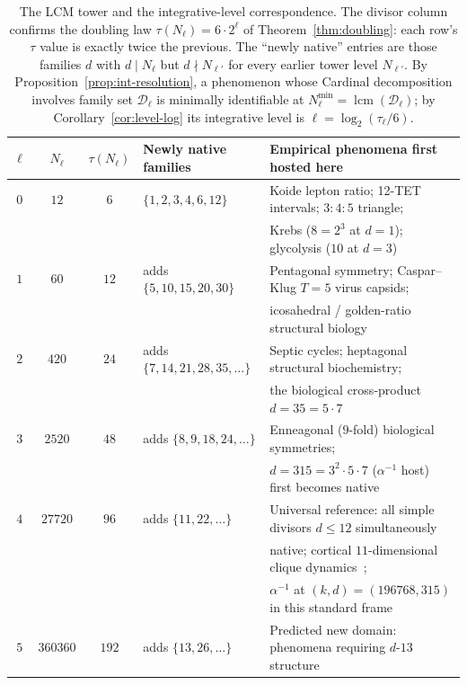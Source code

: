 \documentclass[11pt,a4paper]{article}
\theoremstyle{definition}
\theoremstyle{remark}
\DeclareMathOperator{\lcm}{lcm}
\begin{document}
\begin{table}[h]
\centering
\begin{tabular}{@{}c c c l l@{}}
\toprule
$\ell$ & $N_{\ell}$ & $\tau(N_{\ell})$ & Newly native families & Empirical phenomena first hosted here\\
\midrule
$0$ & $12$ & $6$ & $\{1,2,3,4,6,12\}$ & Koide lepton ratio; 12-TET intervals; $3{:}4{:}5$ triangle;\\
    &      &     &                    & Krebs ($8{=}2^{3}$ at $d{=}1$); glycolysis ($10$ at $d{=}3$)\\
\addlinespace
$1$ & $60$ & $12$ & adds $\{5,10,15,20,30\}$ & Pentagonal symmetry; Caspar--Klug $T{=}5$ virus capsids;\\
    &      &      &                          & icosahedral / golden-ratio structural biology\\
\addlinespace
$2$ & $420$ & $24$ & adds $\{7,14,21,28,35,\ldots\}$ & Septic cycles; heptagonal structural biochemistry;\\
    &       &      &                                 & the biological cross-product $d{=}35{=}5\cdot 7$\\
\addlinespace
$3$ & $2520$ & $48$ & adds $\{8,9,18,24,\ldots\}$ & Enneagonal ($9$-fold) biological symmetries;\\
    &        &      &                             & $d{=}315{=}3^{2}\cdot 5\cdot 7$ ($\alpha^{-1}$ host) first becomes native\\
\addlinespace
$4$ & $27720$ & $96$ & adds $\{11,22,\ldots\}$ & Universal reference: all simple divisors $d\le 12$ simultaneously\\
    &         &      &                         & native; cortical $11$-dimensional clique dynamics~\cite{BlueBrain2017};\\
    &         &      &                         & $\alpha^{-1}$ at $(k,d)=(196768,315)$ in this standard frame\\
\addlinespace
$5$ & $360360$ & $192$ & adds $\{13,26,\ldots\}$ & Predicted new domain: phenomena requiring $d$-$13$ structure\\
\bottomrule
\end{tabular}
\caption{The LCM tower and the integrative-level correspondence. The divisor column confirms the doubling law $\tau(N_{\ell}) = 6\cdot 2^{\ell}$ of Theorem~\ref{thm:doubling}: each row's $\tau$ value is exactly twice the previous. The ``newly native'' entries are those families $d$ with $d\mid N_{\ell}$ but $d\nmid N_{\ell'}$ for every earlier tower level $N_{\ell'}$. By Proposition~\ref{prop:int-resolution}, a phenomenon whose Cardinal decomposition involves family set $\mathcal{D}_{\ell}$ is minimally identifiable at $N_{\ell}^{\min}=\lcm(\mathcal{D}_{\ell})$; by Corollary~\ref{cor:level-log} its integrative level is $\ell = \log_{2}(\tau_{\ell}/6)$.}
\label{tab:int-resolution}
\end{table}
\end{document}
